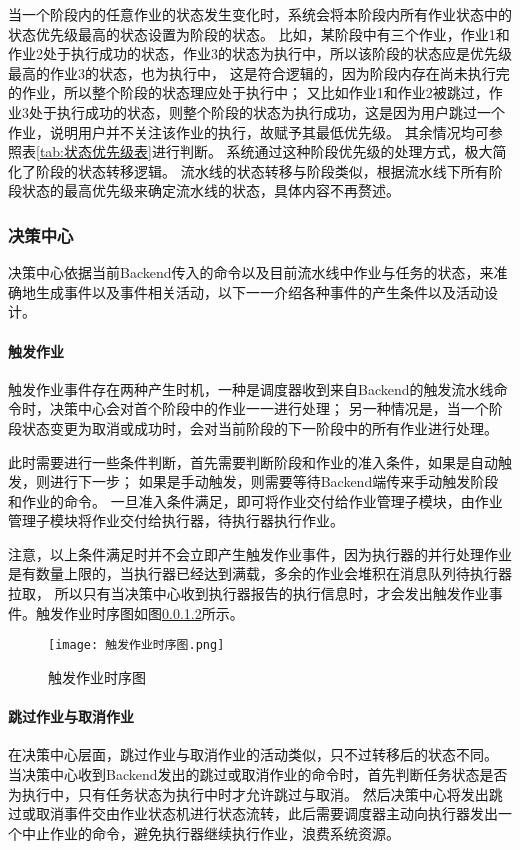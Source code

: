当一个阶段内的任意作业的状态发生变化时，系统会将本阶段内所有作业状态中的状态优先级最高的状态设置为阶段的状态。
比如，某阶段中有三个作业，作业1和作业2处于执行成功的状态，作业3的状态为执行中，所以该阶段的状态应是优先级最高的作业3的状态，也为执行中，
这是符合逻辑的，因为阶段内存在尚未执行完的作业，所以整个阶段的状态理应处于执行中；
又比如作业1和作业2被跳过，作业3处于执行成功的状态，则整个阶段的状态为执行成功，这是因为用户跳过一个作业，说明用户并不关注该作业的执行，故赋予其最低优先级。
其余情况均可参照表\ref{tab:状态优先级表}进行判断。
系统通过这种阶段优先级的处理方式，极大简化了阶段的状态转移逻辑。
流水线的状态转移与阶段类似，根据流水线下所有阶段状态的最高优先级来确定流水线的状态，具体内容不再赘述。

\subsubsection{决策中心}
决策中心依据当前Backend传入的命令以及目前流水线中作业与任务的状态，来准确地生成事件以及事件相关活动，以下一一介绍各种事件的产生条件以及活动设计。

\paragraph{触发作业}
触发作业事件存在两种产生时机，一种是调度器收到来自Backend的触发流水线命令时，决策中心会对首个阶段中的作业一一进行处理；
另一种情况是，当一个阶段状态变更为取消或成功时，会对当前阶段的下一阶段中的所有作业进行处理。

此时需要进行一些条件判断，首先需要判断阶段和作业的准入条件，如果是自动触发，则进行下一步；
如果是手动触发，则需要等待Backend端传来手动触发阶段和作业的命令。
一旦准入条件满足，即可将作业交付给作业管理子模块，由作业管理子模块将作业交付给执行器，待执行器执行作业。

注意，以上条件满足时并不会立即产生触发作业事件，因为执行器的并行处理作业是有数量上限的，当执行器已经达到满载，多余的作业会堆积在消息队列待执行器拉取，
所以只有当决策中心收到执行器报告的执行信息时，才会发出触发作业事件。触发作业时序图如图\ref{}所示。

\begin{figure}[h]
  \centering
  \texttt{[image: 触发作业时序图.png]}
  \caption{触发作业时序图}
  \label{fig:触发作业时序图}
\end{figure}

\paragraph{跳过作业与取消作业}
在决策中心层面，跳过作业与取消作业的活动类似，只不过转移后的状态不同。
当决策中心收到Backend发出的跳过或取消作业的命令时，首先判断任务状态是否为执行中，只有任务状态为执行中时才允许跳过与取消。
然后决策中心将发出跳过或取消事件交由作业状态机进行状态流转，此后需要调度器主动向执行器发出一个中止作业的命令，避免执行器继续执行作业，浪费系统资源。

